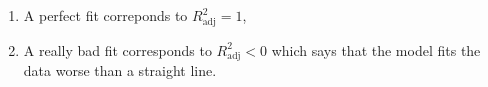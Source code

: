     \begin{enumerate}
    \item A perfect fit correponds to $R^2_{\mathrm{adj}}=1$,
      \item A really bad fit corresponds to $R^2_{\mathrm{adj}}<0$ which says that the model fits the data worse than a straight line.      
      \end{enumerate}
    
  

  